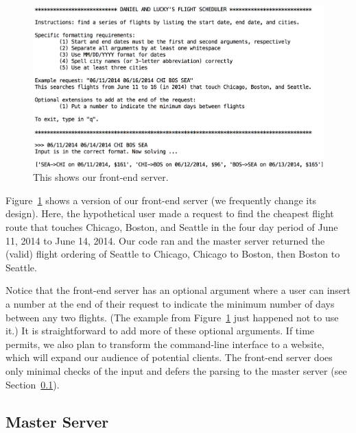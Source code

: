 \documentclass{article}
\begin{document}
\begin{figure}[t]
\vskip 0.2in
\begin{center}
\centerline{\includegraphics[width=\columnwidth]{front_end_server2}}
\caption{This shows our front-end server.}
\label{fig:front_end_server}
\end{center}
\vskip -0.2in
\end{figure}

Figure~\ref{fig:front_end_server} shows a version of our front-end server (we frequently change its design). Here, the hypothetical user made a
request to find the cheapest flight route that touches Chicago, Boston, and Seattle in the four day period of June 11, 2014 to June 14, 2014.
Our code ran and the master server returned the (valid) flight ordering of Seattle to Chicago, Chicago to Boston, then Boston to Seattle.

Notice that the front-end server has an optional argument where a user can insert a number at the end of their request to indicate the minimum number
of days between any two flights. (The example from Figure~\ref{fig:front_end_server} just happened not to use it.) It is straightforward to add
more of these optional arguments. If time permits, we also plan to transform the command-line interface to a website, which will expand our audience
of potential clients. The front-end server does only minimal checks of the input and defers the parsing to the master server (see
Section~\ref{sec:master_server}).


\subsection{Master Server}\label{sec:master_server}
\end{document}
